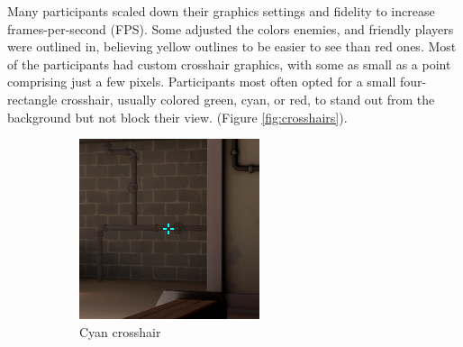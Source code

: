 \documentclass[11pt,manuscript,screen,review]{acmart} %
\begin{document}
Many participants scaled down their graphics settings and fidelity to increase frames-per-second (FPS). Some adjusted the colors enemies, and friendly players were outlined in, believing yellow outlines to be easier to see than red ones. Most of the participants had custom crosshair graphics, with some as small as a point comprising just a few pixels. Participants most often opted for a small four-rectangle crosshair, usually colored green, cyan, or red, to stand out from the background but not block their view. (Figure \ref{fig:crosshairs}). 

\begin{figure}[h]
    \centering
    \begin{subfigure}{0.3\linewidth}
        \includegraphics[width=\linewidth]{img/tenz-cyan.png}
        \caption{Cyan crosshair}
    \end{subfigure}
    \begin{subfigure}{0.3\linewidth}

\end{subfigure}
\end{figure}
\end{document}
